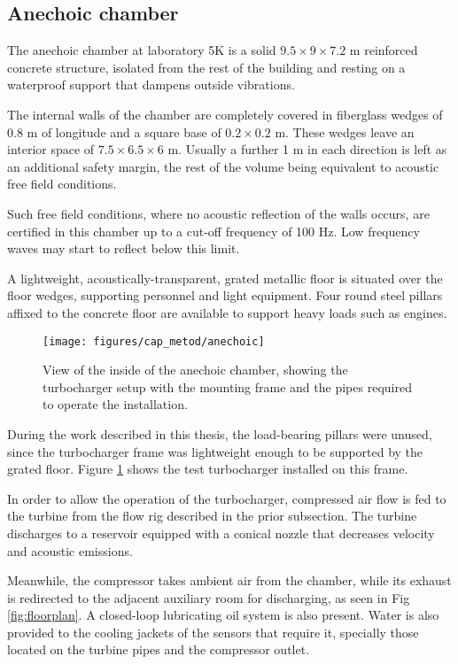 \subsection{Anechoic chamber} \label{sub:anec_chamber}

The anechoic chamber at laboratory 5K is a solid $9.5 \times 9 \times 7.2$ m reinforced concrete structure, isolated from the rest of the building and resting on a waterproof support that dampens outside vibrations.

The internal walls of the chamber are completely covered in fiberglass wedges of 0.8 m of longitude and a square base of $0.2 \times 0.2$ m. These wedges leave an interior space of $7.5 \times 6.5 \times 6$ m. Usually a further 1 m in each direction is left as an additional safety margin, the rest of the volume being equivalent to acoustic free field conditions.

Such free field conditions, where no acoustic reflection of the walls occurs, are certified in this chamber up to a cut-off frequency of 100 Hz. Low frequency waves may start to reflect below this limit.

A lightweight, acoustically-transparent, grated metallic floor is situated over the floor wedges, supporting personnel and light equipment. Four round steel pillars affixed to the concrete floor are available to support heavy loads such as engines.

\begin{figure}[h!]
\centering
\texttt{[image: figures/cap\_metod/anechoic]}
\caption{View of the inside of the anechoic chamber, showing the turbocharger setup with the mounting frame and the pipes required to operate the installation.}
\label{fig:anechoic_chamber}
\end{figure}

During the work described in this thesis, the load-bearing pillars were unused, since the turbocharger frame was lightweight enough to be supported by the grated floor. Figure \ref{fig:anechoic_chamber} shows the test turbocharger installed on this frame.

In order to allow the operation of the turbocharger, compressed air flow is fed to the turbine from the flow rig described in the prior subsection. The turbine discharges to a reservoir equipped with a conical nozzle that decreases velocity and acoustic emissions.

Meanwhile, the compressor takes ambient air from the chamber, while its exhaust is redirected to the adjacent auxiliary room for discharging, as seen in Fig \ref{fig:floorplan}. A closed-loop lubricating oil system is also present. Water is also provided to the cooling jackets of the sensors that require it, specially those located on the turbine pipes and the compressor outlet.

